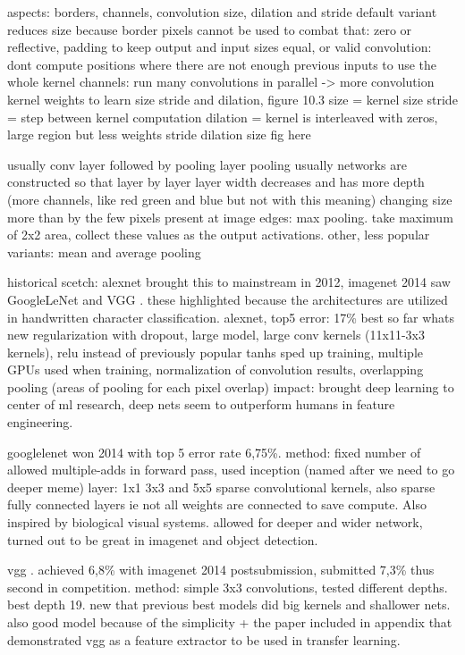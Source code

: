 \documentclass{article}
\begin{document}
aspects: borders, channels, convolution size, dilation and stride
default variant reduces size because border pixels cannot be used
to combat that:
zero or reflective, padding to keep output and input sizes equal, or valid convolution: dont compute positions where there are not enough previous inputs to use the whole kernel
channels: run many convolutions in parallel -> more convolution kernel weights to learn
size stride and dilation, figure 10.3
size = kernel size
stride = step between kernel computation
dilation = kernel is interleaved with zeros, large region but less weights
stride dilation size fig here

usually conv layer followed by pooling layer
pooling
usually networks are constructed so that  layer by layer layer width decreases and has more depth (more channels, like red green and blue but not with this meaning)
changing size more than by the few pixels present at image edges: max pooling. take maximum of 2x2 area, collect these values as the output activations. other, less popular variants: mean and average pooling

historical scetch: alexnet \cite{alexnet} brought this to mainstream in 2012, imagenet 2014 saw GoogleLeNet \cite{googlelenet} and VGG \cite{vgg}.
these highlighted because the architectures are utilized in handwritten character classification.
alexnet, top5 error: 17\% best so far
whats new regularization with dropout, large model, large conv kernels (11x11-3x3 kernels), relu instead of previously popular tanhs sped up training, multiple GPUs used when training, normalization of convolution results, overlapping pooling (areas of pooling for each pixel overlap)
impact: brought deep learning to center of ml research, deep nets seem to outperform humans in feature engineering.

googlelenet \cite{googlelenet} won 2014 with top 5 error rate  6,75\%.
method: fixed number of allowed multiple-adds in forward pass, 
used inception (named after we need to go deeper meme) layer: 1x1 3x3 and 5x5 sparse convolutional kernels, also 
sparse fully connected layers ie not all weights are connected 
to save compute. Also inspired by biological visual systems. allowed
for deeper and wider network, turned out to be great in imagenet and 
object detection.

vgg \cite{vgg}. achieved 6,8\% with imagenet 2014 postsubmission, submitted 7,3\% thus 
second in competition. method: simple 3x3 convolutions, tested different depths. best depth 19.
new that previous best models did big kernels and shallower nets. also good model because of 
the simplicity + the paper included in appendix that demonstrated vgg as a feature extractor to 
be used in transfer learning.
\end{document}

